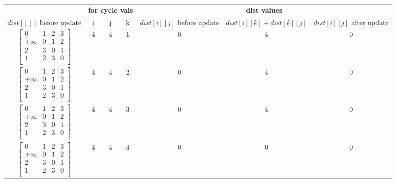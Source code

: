 \begin{table}[h]
\centering
\begin{tabular}{ccccccc}
\toprule
\multicolumn{1}{c}{} & \multicolumn{3}{c}{\textbf{for cycle vals}} & \multicolumn{3}{c}{\textbf{dist values}} \\
\cmidrule(rl){2-4} \cmidrule(rl){5-7}
{$dist[][]$ before update} & {i} & {j} & {k} & {$dist[i][j]$ before update} & {$dist[i][k] + dist[k][j]$} & {$dist[i][j]$ after update} \\
\midrule
$\begin{bmatrix}
   0 & 1 & 2 & 3 \\
   +\infty & 0 & 1 & 2 \\
   2 & 3 & 0 & 1 \\
   1 & 2 & 3 & 0 \\
\end{bmatrix}$ & 4 & 4 & 1 & 0 & 4 & 0 \\
\bottomrule
$\begin{bmatrix}
   0 & 1 & 2 & 3 \\
   +\infty & 0 & 1 & 2 \\
   2 & 3 & 0 & 1 \\
   1 & 2 & 3 & 0 \\
\end{bmatrix}$ & 4 & 4 & 2 & 0 & 4 & 0 \\
\bottomrule
$\begin{bmatrix}
   0 & 1 & 2 & 3 \\
   +\infty & 0 & 1 & 2 \\
   2 & 3 & 0 & 1 \\
   1 & 2 & 3 & 0 \\
\end{bmatrix}$ & 4 & 4 & 3 & 0 & 4 & 0 \\
\bottomrule
$\begin{bmatrix}
   0 & 1 & 2 & 3 \\
   +\infty & 0 & 1 & 2 \\
   2 & 3 & 0 & 1 \\
   1 & 2 & 3 & 0 \\
\end{bmatrix}$ & 4 & 4 & 4 & 0 & 0 & 0 \\
\bottomrule
\end{tabular}
\end{table}

